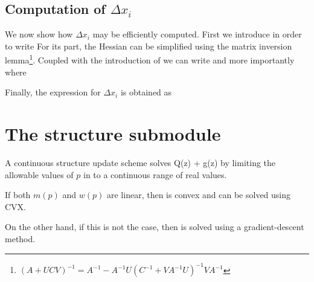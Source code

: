 \subsection{Computation of $\Delta x_i$}
We now show how $\Delta x_i$ may be efficiently computed.
First we introduce
    in order to write
For its part, the Hessian can be simplified using the matrix inversion lemma\footnote{$(A + UCV)^{-1} = A^{-1} - A^{-1}U (C^{-1} + V A^{-1} U)^{-1} V A^{-1}$}.
Coupled with the introduction of 
    we can write
    and more importantly
    where
 
Finally, the expression for $\Delta x_i$ is obtained as
        
    
\section{The structure submodule}
A continuous structure update scheme solves
        {\argmin Q(z) + g(z)}
    by limiting the allowable values of $p$
    in  to a continuous range
    of real values.

If both $m(p)$ and $w(p)$ are linear, 
    then  is convex
    and can be solved using CVX.

On the other hand, if this is not the case, 
    then 
    is solved using a gradient-descent method.

